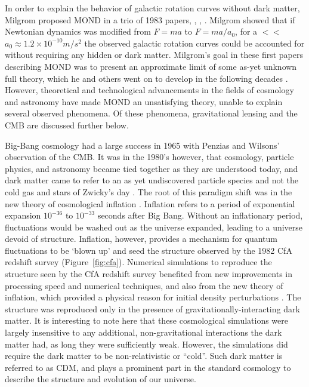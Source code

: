 In order to explain the behavior of galactic rotation curves without dark matter, Milgrom proposed \ac{MOND} in a trio of 1983 papers, \cite{Milgrom1983_1}, \cite{Milgrom1983_2}, \cite{Milgrom1983_3}. Milgrom showed that if Newtonian dynamics was modified from $F = ma$ to $F= ma / a_{0}$, for a $<<$ $a_{0} \approx 1.2 \times 10^{-10} m/s^{2}$ the observed galactic rotation curves could be accounted for without requiring any hidden or dark matter. Milgrom's goal in these first papers describing \ac{MOND} was to present an approximate limit of some as-yet unknown full theory, which he and others went on to develop in the following decades \cite{Bertone2016}. However, theoretical and technological advancements in the fields of cosmology and astronomy have made \ac{MOND} an unsatisfying theory, unable to explain several observed phenomena. Of these phenomena, gravitational lensing and the \ac{CMB} are discussed further below.

Big-Bang cosmology had a large success in 1965 with Penzias and Wilsons' observation of the \ac{CMB}. It was in the 1980's however, that cosmology, particle physics, and astronomy became tied together as they are understood today, and dark matter came to refer to an as yet undiscovered particle species and not the cold gas and stars of Zwicky's day \cite{Bertone2016}. The root of this paradigm shift was in the new theory of cosmological inflation \cite{Bertone2016}. Inflation refers to a period of exponential expansion $10^{-36}$ to $10^{-33}$ seconds after Big Bang. Without an inflationary period, fluctuations would be washed out as the universe expanded, leading to a universe devoid of structure. Inflation, however, provides a mechanism for quantum fluctuations to be `blown up' and seed the structure observed by the 1982 CfA redshift survey (Figure~\ref{fig:cfa}). Numerical simulations to reproduce the structure seen by the CfA redshift survey benefited from new improvements in processing speed and numerical techniques, and also from the new theory of inflation, which provided a physical reason for initial density perturbations \cite{Bertone2016}. The structure was reproduced only in the presence of gravitationally-interacting dark matter. It is interesting to note here that these cosmological simulations were largely insensitive to any additional, non-gravitational interactions the dark matter had, as long they were sufficiently weak. However, the simulations did require the dark matter to be non-relativistic or ``cold''. Such dark matter is referred to as \ac{CDM}, and plays a prominent part in the standard cosmology to describe the structure and evolution of our universe.  

